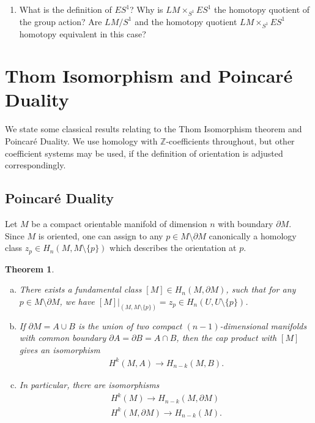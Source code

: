 \documentclass{scrartcl}
\theoremstyle{plain}
\newtheorem{theorem}{Theorem}[section]
\theoremstyle{definition}
\newcommand{\Z}{\mathbb Z}
\newcommand{\union}{\mathbin{\cup}}
\newcommand{\isect}{\mathbin{\cap}}
\begin{document}
\begin{enumerate}
\item What is the definition of $ES^1$? Why is $LM\times_{S^1} ES^1$ the homotopy quotient of the group action? Are $LM/S^1$ and the homotopy quotient $LM\times_{S^1} ES^1$ homotopy equivalent in this case?


\end{enumerate} %













\newpage
\appendix
\section{Thom Isomorphism and Poincaré Duality}
We state some classical results relating to the Thom Isomorphism theorem and Poincaré Duality. We use homology with $\Z$-coefficients throughout, but other coefficient systems may be used, if the definition of orientation is adjusted correspondingly.


\subsection{Poincaré Duality}
Let $M$ be a compact orientable manifold of dimension $n$ with boundary $\partial M$. Since $M$ is oriented, one can assign to any $p\in M\setminus \partial M$ canonically a homology class $z_p\in H_n(M, M\setminus \{p\})$ which describes the orientation at $p$.
\begin{theorem} \label{thm:poincare_duality}
\begin{enumerate}[(a)]
    \item There exists a \emph{fundamental class} $[M]\in H_n(M,\partial M)$, such that for any $p\in M\setminus \partial M$, we have $[M]|_{(M, M\setminus\{p\})} = z_p\in H_n(U, U\setminus \{p\})$.
    \item If $\partial M = A \union B$ is the union of two compact $(n-1)$-dimensional manifolds with common boundary $\partial A = \partial B = A\isect B$, then the cap product with $[M]$ gives an isomorphism
    \begin{align*}
        H^k(M, A) \to H_{n-k}(M, B).
    \end{align*}
    \item In particular, there are isomorphisms
    \begin{align*}
        H^k(M) \to H_{n-k}(M, \partial M) \\
        H^k(M,\partial M) \to H_{n-k}(M).
    \end{align*}
\end{enumerate}
\end{theorem}
\end{document}

